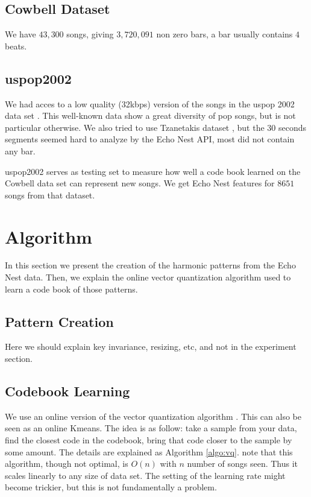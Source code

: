 \documentclass{article}
\begin{document}
\subsection{Cowbell Dataset}
We have $43,300$ songs, giving  $3,720,091$ non zero bars, a bar usually 
contains $4$ beats.


\subsection{uspop2002}
We had acces to a low quality (32kbps) version of the songs in the uspop 2002 
data set \cite{uspop2002}.
This well-known data show a great diversity of pop songs, but is not particular
otherwise. We also tried to use Tzanetakis dataset \cite{Tzanetakis2002a}, but 
the $30$ seconds segments seemed hard to analyze by the Echo Nest API, most did
not contain any bar.

uspop2002 serves as testing set to measure how well a code book learned on
the Cowbell data set can represent new songs. We get Echo Nest features
for $8651$ songs from that dataset.

\section{Algorithm}\label{sec:algo}
In this section we present the creation of the harmonic patterns from
the Echo Nest data. Then, we explain the online vector quantization algorithm
used to learn a code book of those patterns.

\subsection{Pattern Creation}
Here we should explain key invariance, resizing, etc, and not in the
experiment section.


\subsection{Codebook Learning}
We use an online version of the vector quantization algorithm 
\cite{Gersho1991}. This can also be seen as an online Kmeans.
The idea is as follow: take a sample from your data, find the closest
code in the codebook, bring that code closer to the sample by some amount.
The details are explained as Algorithm \ref{algo:vq}. note that this
algorithm, though not optimal, is $O(n)$ with $n$ number of songs seen.
Thus it scales linearly to any size of data set. The setting of the learning
rate might become trickier, but this is not fundamentally a problem.
\end{document}
